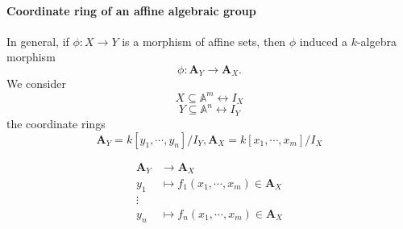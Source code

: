 \paragraph{Coordinate ring of an affine algebraic group}

In general, if $\phi \colon X \longrightarrow Y$ is a morphism of affine sets, then $\phi$ induced a $k$-algebra morphism
\[\phi\colon \mathbf{A}_Y \longrightarrow \mathbf{A}_X.\]
We consider
\[X\subseteq \mathbb{A}^m \longleftrightarrow I_X \]
\[Y\subseteq \mathbb{A}^n \longleftrightarrow I_Y \]
the coordinate rings
\[\mathbf{A}_Y=k[y_1,\cdots,y_n]/I_Y,\mathbf{A}_X=k[x_1,\cdots,x_m]/I_X  \]

\begin{align*}
	\mathbf{A}_Y & \longrightarrow \mathbf{A}_X\\
	y_1 &\mapsto f_1(x_1,\cdots,x_m) \in \mathbf{A}_X\\
	\vdots & \\
	y_n&\mapsto f_n(x_1,\cdots,x_m) \in \mathbf{A}_X
\end{align*}

